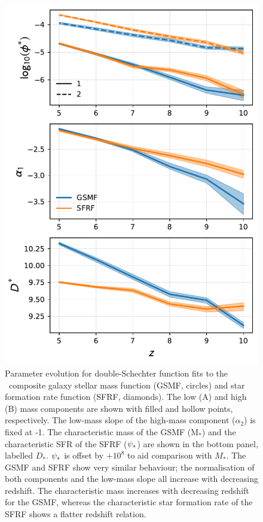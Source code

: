 \begin{figure}
	\includegraphics[width=\columnwidth]{images/fit_param_evolution.pdf}
    \caption{Parameter evolution for double-Schechter function fits to the \flares\ composite galaxy stellar mass function (GSMF, circles) and star formation rate function (SFRF, diamonds).
    The low (A) and high (B) mass components are shown with filled and hollow points, respectively.
    The low-mass slope of the high-mass component ($\alpha_{2}$) is fixed at -1.
    The characteristic mass of the GSMF ($\mathrm{M_{*}}$) and the characteristic SFR of the SFRF ($\psi_*$) are shown in the bottom panel, labelled $D_*$.
    $\psi_*$ is offset by $+10^{8}$ to aid comparison with $M_{*}$.
    The GSMF and SFRF show very similar behaviour; the normalisation of both components and the low-mass slope all increase with decreasing redshift.
    The characteristic mass increases with decreasing redshift for the GSMF, whereas the characteristic star formation rate of the SFRF shows a flatter redshift relation.
    }
    \label{fig:fit_param_evolution}
\end{figure}

